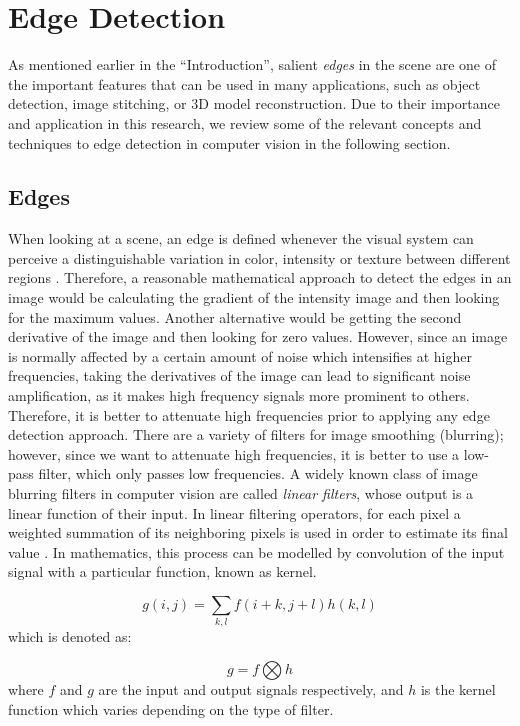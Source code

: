 \section{Edge Detection}

As mentioned earlier in the ``Introduction'', salient {\it edges} in the scene are one of the important features 
that can be used in many applications, such as object detection, image stitching, or 3D model reconstruction.
Due to their importance and application in this research, we review some of the relevant concepts and techniques to edge detection
in computer vision in the following section.

\subsection{Edges}
When looking at a scene, an edge is defined whenever the visual system can perceive a distinguishable variation in color, intensity or texture between 
different regions \cite{sze11}.
Therefore, a reasonable mathematical approach to detect the edges in an image would be calculating the gradient of the intensity image and then looking for the maximum
values. Another alternative would be getting the second derivative of the image and then looking for zero values. However, since an image is normally affected by a 
certain amount of noise which intensifies at higher frequencies, taking the derivatives of the image can lead to significant noise amplification, 
as it makes high frequency signals more prominent to others.
Therefore, it is better to attenuate high frequencies prior to applying any edge detection approach. 
There are a variety of filters for image smoothing (blurring); however, since we want to attenuate high frequencies, it is better to use a low-pass filter,
which only passes low frequencies.
A widely known class of image blurring filters in computer vision are called {\it linear filters}, whose output is a linear function of their input. 
In linear filtering operators, for each pixel a weighted summation of its neighboring pixels
is used in order to estimate its final value \cite{sze11}. In mathematics, this process can be modelled by convolution of the input signal with a particular function, known as kernel. 

\begin{equation}
g(i,j)=\sum_{k,l}f(i+k,j+l)h(k,l)
\end{equation}
which is denoted as:

\begin{equation}
g=f\bigotimes h
\end{equation}
where $f$ and $g$ are the input and output signals respectively, and $h$ is the kernel function which varies depending on the type of filter. 

